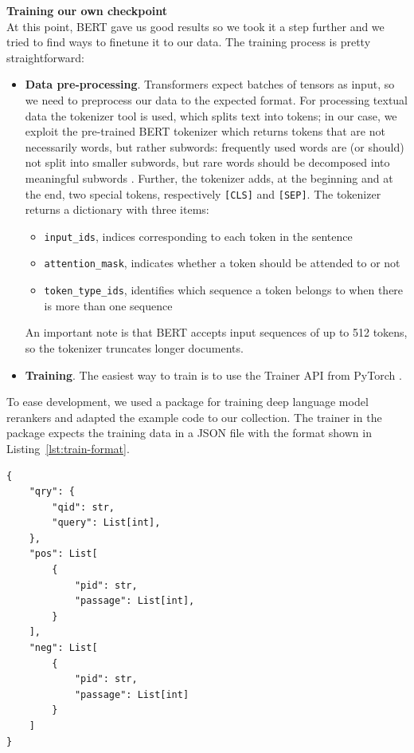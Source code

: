 \noindent \textbf{Training our own checkpoint}\\
At this point, BERT gave us good results so we took it a step further and we tried to find ways to finetune it to our data. The training process is pretty straightforward: 
\begin{itemize}
\item \textbf{Data pre-processing}. Transformers expect batches of tensors as input, so we need to preprocess our data to the expected format. For processing textual data the tokenizer tool is used, which splits text into tokens; in our case, we exploit the pre-trained BERT tokenizer which returns tokens that are not necessarily words, but rather subwords: frequently used words are (or should) not split into smaller subwords, but rare words should be decomposed into meaningful subwords \cite{HfTokenizer}. Further, the tokenizer adds, at the beginning and at the end, two special tokens, respectively \texttt{[CLS]} and \texttt{[SEP]}. The tokenizer returns a dictionary with three items: 
	\begin{itemize}
		\item \texttt{input\_ids}, indices corresponding to each token in the sentence
		\item \texttt{attention\_mask}, indicates whether a token should be attended to or not
		\item \texttt{token\_type\_ids}, identifies which sequence a token belongs to when there is more than one sequence
	\end{itemize}
An important note is that BERT accepts input sequences of up to 512 tokens, so the tokenizer truncates longer documents. 
\item \textbf{Training}. The easiest way to train is to use the Trainer API from PyTorch \cite{HfTrainer}.
\end{itemize} 
To ease development, we used a package for training deep language model rerankers\cite{gao2021lce} and adapted the example code to our collection. The trainer in the package expects the training data in a JSON file with the format shown in Listing~\ref{lst:train-format}. 

\begin{lstlisting}[label={lst:train-format},caption={Train format},captionpos=b, xleftmargin=.2\textwidth]
{
    "qry": {
        "qid": str,
        "query": List[int],
    },
    "pos": List[
        {
            "pid": str,
            "passage": List[int],
        }
    ],
    "neg": List[
        {
            "pid": str,
            "passage": List[int]
        }
    ]
}
\end{lstlisting}

